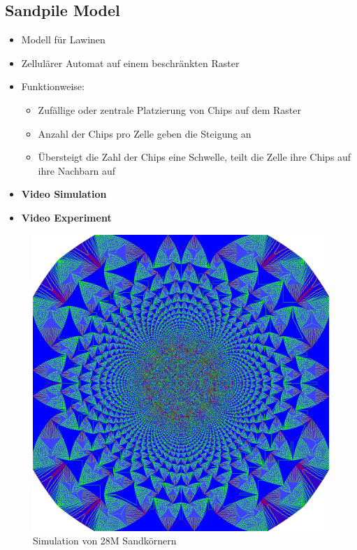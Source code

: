 \documentclass{beamer}
\begin{document}
\subsection{Sandpile Model}
\begin{frame}{\insertsection}{\insertsubsection}
	\begin{itemize}
        \item Modell für Lawinen
        \item Zellulärer Automat auf einem beschränkten Raster
        \pause
        \item Funktionweise:
            \pause
            \begin{itemize}
                \item Zufällige oder zentrale Platzierung von Chips auf dem Raster
                \pause
                \item Anzahl der Chips pro Zelle geben die Steigung an
                \pause
                \item Übersteigt die Zahl der Chips eine Schwelle, teilt die Zelle ihre Chips auf ihre Nachbarn auf
            \end{itemize}
        \item \textbf{Video Simulation}
        \item \textbf{Video Experiment}
	\end{itemize}
\end{frame}

\begin{frame}{\insertsection}{\insertsubsection}
    \begin{figure}[p]
        \centering
        \includegraphics[scale=0.17]{Backtang2.png}
        \caption{Simulation von 28M Sandkörnern}
    \end{figure}
\end{frame}
\end{document}
